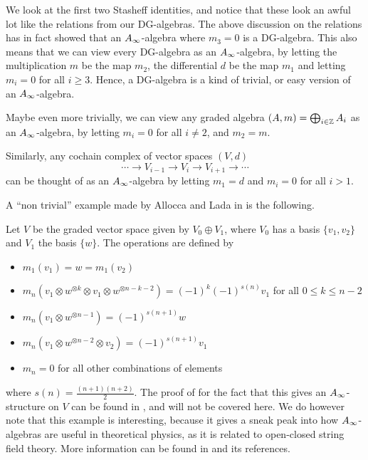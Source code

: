 \begin{example}[DG-algebras]
We look at the first two Stasheff identities, and notice that these look an awful lot like the relations from our DG-algebras. The above discussion on the relations has in fact showed that an $A_{\infty}$-algebra where $m_3 = 0$ is a DG-algebra. This also means that we can view every DG-algebra as an $A_{\infty}$-algebra, by letting the multiplication $m$ be the map $m_2$, the differential $d$ be the map $m_1$ and letting $m_i=0$ for all $i\geq 3$. Hence, a DG-algebra is a kind of trivial, or easy version of an $A_{\infty}$-algebra.
\end{example}

\begin{example}
Maybe even more trivially, we can view any graded algebra $(A, m)=\bigoplus_{i\in \mathbb{Z}} A_i$ as an $A_{\infty}$-algebra, by letting $m_i=0$ for all $i\neq 2$, and $m_2 = m$. 

Similarly, any cochain complex of vector spaces $(V,d)$
\begin{equation*}
	\cdots \longrightarrow V_{i-1} \longrightarrow V_i \longrightarrow V_{i+1} \longrightarrow \cdots 
\end{equation*}
can be thought of as an $A_{\infty}$-algebra by letting $m_1=d$ and $m_i=0$ for all $i>1$. 
\end{example}

A ``non trivial'' example made by Allocca and Lada in \cite{sha-example} is the following. 
\begin{example}
Let $V$ be the graded vector space given by $V_0\oplus V_1$, where $V_0$ has a basis $\{v_1, v_2\}$ and $V_1$ the basis $\{w\}$. The operations are defined by 
\begin{itemize}
	\item $m_1(v_1) = w = m_1(v_2)$
	\item $m_n(v_1\otimes w^{\otimes k}\otimes v_1\otimes w^{\otimes n-k-2}) = (-1)^k (-1)^{s(n)} v_1$ for all $0\leq k\leq n-2$
	\item $m_n(v_1\otimes w^{\otimes n-1})= (-1)^{s(n+1)}w$
	\item $m_n(v_1\otimes w^{\otimes n-2}\otimes v_2)= (-1)^{s(n+1)}v_1$
	\item $m_n = 0$ for all other combinations of elements 
\end{itemize}
where $s(n)=\frac{(n+1)(n+2)}{2}$. The proof of for the fact that this gives an $A_{\infty}$-structure on $V$ can be found in \cite{sha-example}, and will not be covered here. We do however note that this example is interesting, because it gives a sneak peak into how $A_{\infty}$-algebras are useful in theoretical physics, as it is related to open-closed string field theory. More information can be found in \cite{sha-example} and its references. 
\end{example}


